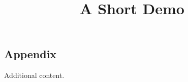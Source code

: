 \documentclass[article]{jss}
\title{A Short Demo}
\begin{document}
\begin{appendix}
\section{Appendix}
Additional content.
\end{appendix}
\end{document}
